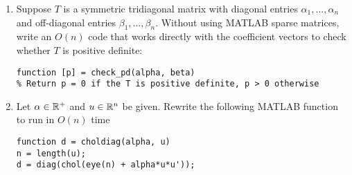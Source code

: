 \documentclass[12pt, leqno]{article}
\begin{document}
\begin{enumerate}
\item
  Suppose $T$ is a symmetric tridiagonal matrix with diagonal entries
  $\alpha_1, \ldots, \alpha_n$ and off-diagonal entries $\beta_1,
  \ldots, \beta_n$.  Without using MATLAB sparse matrices, write an
  $O(n)$ code that works directly with the coefficient vectors to
  check whether $T$ is positive definite:
\begin{verbatim}
function [p] = check_pd(alpha, beta)
% Return p = 0 if the T is positive definite, p > 0 otherwise
\end{verbatim}
  
\item
  Let $\alpha \in \mathbb{R}^+$ and $u \in \mathbb{R}^n$ be given.
  Rewrite the following MATLAB function to run in $O(n)$ time
\begin{verbatim}
function d = choldiag(alpha, u)
n = length(u);
d = diag(chol(eye(n) + alpha*u*u'));
\end{verbatim}

\end{enumerate}
\end{document}
